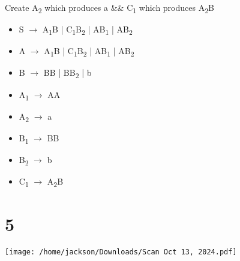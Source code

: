 \documentclass[11pt]{article}
\begin{document}
Create A\textsubscript{2} which produces a \&\& C\textsubscript{1} which produces A\textsubscript{2}B
\begin{itemize}
\item S \(\rightarrow\) A\textsubscript{1}B | C\textsubscript{1}B\textsubscript{2} | AB\textsubscript{1} | AB\textsubscript{2}
\item A \(\rightarrow\) A\textsubscript{1}B | C\textsubscript{1}B\textsubscript{2} | AB\textsubscript{1} | AB\textsubscript{2}
\item B \(\rightarrow\) BB | BB\textsubscript{2} | b
\item A\textsubscript{1} \(\rightarrow\) AA
\item A\textsubscript{2} \(\rightarrow\) a
\item B\textsubscript{1} \(\rightarrow\) BB
\item B\textsubscript{2} \(\rightarrow\) b
\item C\textsubscript{1} \(\rightarrow\) A\textsubscript{2}B
\end{itemize}
\section{5}
\label{sec:org722fcd6}
\begin{center}
\texttt{[image: /home/jackson/Downloads/Scan Oct 13, 2024.pdf]}
\end{center}
\end{document}
